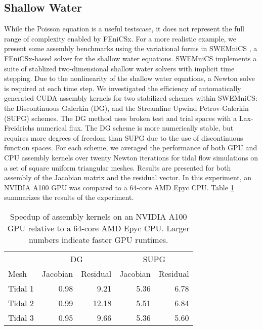 \subsection*{Shallow Water}

While the Poisson equation is a useful testscase, it does not represent the full range of complexity enabled by FEniCSx. For a more realistic example, we present some assembly benchmarks using the variational forms in SWEMniCS \citep{dawson2024swemnics}, a FEniCSx-based solver for the shallow water equations. SWEMniCS implements a suite of stablized two-dimensional shallow water solvers with implicit time stepping. Due to the nonlinearity of the shallow water equations, a Newton solve is required at each time step. We investigated the efficiency of automatically generated CUDA assembly kernels for two stabilized schemes within SWEMniCS: the Discontinuous Galerkin (DG), and the Streamline Upwind Petrov-Galerkin (SUPG) schemes. The DG method uses broken test and trial spaces with a Lax-Freidrichs numerical flux. The DG scheme is more numerically stable, but requires more degrees of freedom than SUPG due to the use of discontinuous function spaces. For each scheme, we averaged the performance of both GPU and CPU assembly kernels over twenty Newton iterations for tidal flow simulations on a set of square uniform triangular meshes. Results are presented for both assembly of the Jacobian matrix and the residual vector. In this experiment, an NVIDIA A100 GPU was compared to a 64-core AMD Epyc CPU.
Table \ref{tab:swe_a100_vs_epyc} summarizes the results of the experiment.
\begin{table}[t]
    \centering
    \begin{tabular}{lrrrr}
\toprule
        & \multicolumn{2}{c}{DG} & \multicolumn{2}{c}{SUPG} \\
          \cmidrule(lr){2-3}       \cmidrule(lr){4-5}
Mesh    & Jacobian & Residual    & Jacobian & Residual \\
\midrule
Tidal 1 &     0.98 &        9.21 &     5.36 &     6.78 \\
Tidal 2 &     0.99 &       12.18 &     5.51 &     6.84 \\
Tidal 3 &     0.95 &        9.66 &     5.36 &     5.60 \\
\bottomrule
\end{tabular}
    \caption{Speedup of assembly kernels on an NVIDIA A100 GPU relative to a 64-core AMD Epyc CPU. Larger numbers indicate faster GPU runtimes.}
    \label{tab:swe_a100_vs_epyc}
\end{table}

